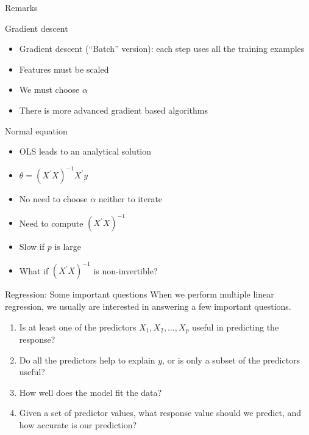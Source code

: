 \documentclass[
  9pt,
  ignorenonframetext,
  aspectratio=169,
  t, dvipsnames]{beamer}
\providecommand{\tightlist}{%
  \setlength{\itemsep}{0pt}\setlength{\parskip}{0pt}}\usepackage{longtable,booktabs,array}
\theoremstyle{definition}
\begin{document}
\begin{frame}{Remarks}
\protect\hypertarget{remarks}{}
\begin{block}{Gradient descent}

\begin{itemize}
\tightlist
\item
  Gradient descent (``Batch'' version): each step uses all the training
  examples
\item
  Features must be scaled
\item
  We must choose \(\alpha\)
\item
  There is more advanced gradient based algorithms
\end{itemize}

\end{block}

\begin{alertblock}{Normal equation}

\begin{itemize}
\tightlist
\item
  OLS leads to an analytical solution
\item
  \(\theta = (X^{\prime}X)^{-1} X^{\prime} y\)
\item
  No need to choose \(\alpha\) neither to iterate
\item
  Need to compute \((X^{\prime}X)^{-1}\)
\item
  Slow if \(p\) is large
\item
  What if \((X^{\prime}X)^{-1}\) is non-invertible?
\end{itemize}

\end{alertblock}
\end{frame}

\begin{frame}{Regression: Some important questions}
\protect\hypertarget{regression-some-important-questions}{}
When we perform multiple linear regression, we usually are interested in
answering a few important questions.

\begin{enumerate}
\tightlist
\item
  Is at least one of the predictors \(X_1 ,X_2 ,\ldots,X_p\) useful in
  predicting the response?
\item
  Do all the predictors help to explain \(y\), or is only a subset of
  the predictors useful?
\item
  How well does the model fit the data?
\item
  Given a set of predictor values, what response value should we
  predict, and how accurate is our prediction?
\end{enumerate}
\end{frame}
\end{document}
